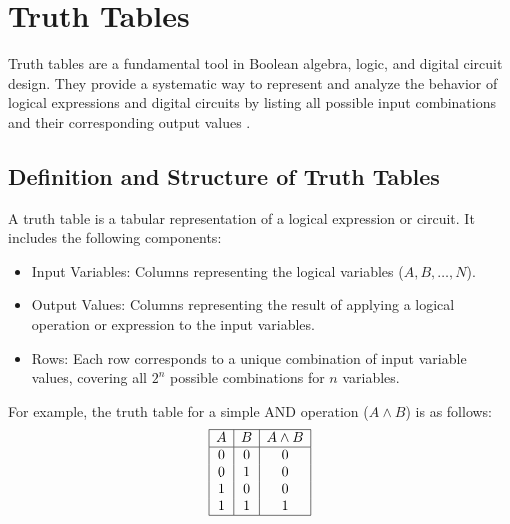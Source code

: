 \section{Truth Tables}
Truth tables are a fundamental tool in Boolean algebra, logic, and digital circuit design. They provide a systematic way to represent and analyze the behavior of logical expressions and digital circuits by listing all possible input combinations and their corresponding output values \cite{rosen2018, tanenbaum2013}.

\subsection{Definition and Structure of Truth Tables}
A truth table is a tabular representation of a logical expression or circuit. It includes the following components:
\begin{itemize}
    \item Input Variables: Columns representing the logical variables (\( A, B, \ldots, N \)).
    \item Output Values: Columns representing the result of applying a logical operation or expression to the input variables.
    \item Rows: Each row corresponds to a unique combination of input variable values, covering all \( 2^n \) possible combinations for \( n \) variables.
\end{itemize}

For example, the truth table for a simple AND operation (\( A \land B \)) is as follows:
\[
\begin{array}{|c|c|c|}
\hline
A & B & A \land B \\
\hline
0 & 0 & 0 \\
0 & 1 & 0 \\
1 & 0 & 0 \\
1 & 1 & 1 \\
\hline
\end{array}
\]

